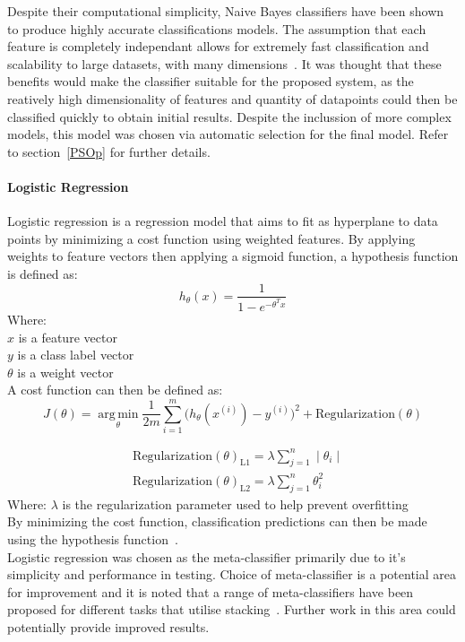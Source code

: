 \documentclass[titlepage, 12pt]{scrartcl} \usepackage{enumitem}
\DeclareMathOperator*{\argmin}{arg\,min}
\begin{document}
Despite their computational simplicity, Naive Bayes classifiers have been shown
to produce highly accurate classifications models. The assumption that each feature is
completely independant allows for extremely fast classification and scalability
to large datasets, with many dimensions~\parencite[p.300]{Zhang2004}. It was
thought that these benefits would make the classifier suitable for the proposed system, as the reatively high
dimensionality of features and quantity of datapoints could then be classified
quickly to obtain initial results. Despite the inclussion of more complex
models, this model was chosen via automatic selection for the final model.
Refer to section~\ref{PSOp} for further details.

\paragraph{Logistic Regression}
Logistic regression is a regression model that aims to fit as hyperplane to
data points by minimizing a cost function using weighted features.
By applying weights to feature vectors then applying a sigmoid function, a
hypothesis function is defined as:
\begin{equation}
    h_\theta(x)=\frac{1}{1-e^{-\theta^{T}x}}
\end{equation}
Where:\\
$x$ is a feature vector\\
$y$ is a class label vector \\
$\theta$ is a weight vector \\
A cost function can then be defined as:
\begin{equation}
    J(\theta)=\argmin\limits_\theta\frac{1}{2m}\sum\limits_{i=1}^m\Big(h_\theta(x^{(i)})-y^{(i)}\Big)^2+\text{Regularization}(\theta)
\end{equation}

\begin{align}
    &\text{Regularization}{(\theta)}_\text{L1}=\lambda\sum\limits_{j=1}^n\mid\theta_i\mid\\
    &\text{Regularization}{(\theta)}_\text{L2}=\lambda\sum\limits_{j=1}^n\theta_i^2
\end{align}
Where:
$\lambda$ is the regularization parameter used to help prevent overfitting\\
By minimizing the cost function, classification predictions can then be made
using the hypothesis function~\parencite{Ng2012}.\\
Logistic regression was chosen as the meta-classifier primarily due to it's
simplicity and performance in testing. Choice of meta-classifier is a potential
area for improvement and it is noted that a range of meta-classifiers have been
proposed for different tasks that utilise
stacking~\parencite[p.29]{Sesmero2015}. Further work in this area could
potentially provide improved results.
\end{document}
